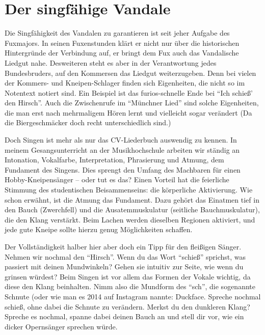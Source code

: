 \section{Der singfähige Vandale}


\begin{multicols}{2}
	
	Die Singfähigkeit des Vandalen zu garantieren ist seit jeher Aufgabe des Fuxmajors. In seinen Fuxenstunden klärt er nicht nur über die historischen Hintergründe der Verbindung auf, er bringt dem Fux auch das Vandalische Liedgut nahe. 
	Desweiteren steht es aber in der Verantwortung jedes Bundesbruders, auf den Kommersen das Liedgut weiterzugeben. Denn bei vielen der Kommers- und Kneipen-Schlager finden sich Eigenheiten, die nicht so im Notentext notiert sind. Ein Beispiel ist das furios-schnelle Ende bei “Ich schieß’ den Hirsch”. Auch die Zwischenrufe im “Münchner Lied” sind solche Eigenheiten, die man erst nach mehrmaligem Hören lernt und vielleicht sogar verändert (Da die Biergeschmäcker doch recht unterschiedlich sind.)
	
	Doch Singen ist mehr als nur das CV-Liederbuch auswendig zu kennen. In meinem Gesangsunterricht an der Musikhochschule arbeiten wir ständig an Intonation, Vokalfarbe, Interpretation, Phrasierung und Atmung, dem Fundament des Singens.
	Dies sprengt den Umfang des Machbaren für einen Hobby-Kneipensänger – oder tut es das? Einen Vorteil hat die feierliche Stimmung des studentischen Beisammenseins: die körperliche Aktivierung. Wie schon erwähnt, ist die Atmung das Fundament. Dazu gehört das Einatmen tief in den Bauch (Zwerchfell) und die Ausatemmuskulatur (seitliche Bauchmuskulatur), die den Klang verstärkt. Beim Lachen werden dieselben Regionen aktiviert, und jede gute Kneipe sollte hierzu genug Möglichkeiten schaffen.
	
	Der Vollständigkeit halber hier aber doch ein Tipp für den fleißigen Sänger. Nehmen wir nochmal den “Hirsch”. Wenn du das Wort “schieß” sprichst, was passiert mit deinen Mundwinkeln? Gehen sie intuitiv zur Seite, wie wenn du grinsen würdest?
	Beim Singen ist vor allem das Formen der Vokale wichtig, da diese den Klang beinhalten. Nimm also die Mundform des “sch”, die sogenannte Schnute (oder wie man es 2014 auf Instagram nannte: Duckface. Spreche nochmal \glqq schieß\grqq, ohne dabei die Schnute zu verändern. Merkst du den dunkleren Klang? Spreche es nochmal, spanne dabei deinen Bauch an und stell dir vor, wie ein dicker Opernsänger sprechen würde.
	

\end{multicols}
